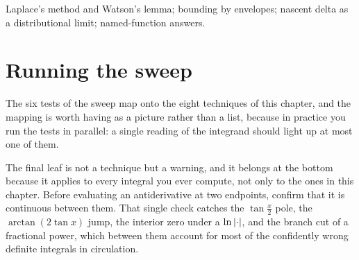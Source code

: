 \begin{seealsob}Laplace's method and Watson's lemma; bounding by envelopes; nascent delta as a distributional limit; named-function answers.\end{seealsob}

\section{Running the sweep}

The six tests of the sweep map onto the eight techniques of this chapter, and the mapping is worth having as a picture rather than a list, because in practice you run the tests in parallel: a single reading of the integrand should light up at most one of them.

\begin{center}
\end{center}

The final leaf is not a technique but a warning, and it belongs at the bottom because it applies to every integral you ever compute, not only to the ones in this chapter. Before evaluating an antiderivative at two endpoints, confirm that it is continuous between them. That single check catches the $\tan\tfrac x2$ pole, the $\arctan(2\tan x)$ jump, the interior zero under a $\ln\left\lvert \cdot\right\rvert$, and the branch cut of a fractional power, which between them account for most of the confidently wrong definite integrals in circulation.

